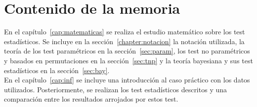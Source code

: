 \section*{Contenido de la memoria}
	En el capítulo~\ref{cap:matematicas} se realiza el estudio
matemático sobre los test estadísticos. Se incluye en la 
sección~\ref{chapter:notacion} la notación
utilizada, la teoría de los test paramétricos en la
sección~\ref{sec:param}, los test no paramétricos y 
basados en permutaciones en la sección~\ref{sec:tnp} 
y la teoría bayesiana y sus test estadísticos en la
sección~\ref{sec:bay}.\\
	En el capítulo~\ref{cap:inf} se incluye una introducción
al caso práctico con los datos utilizados. Posteriormente,
se realizan los test estadísticos descritos y una comparación 
entre los resultados arrojados por estos test.









	

